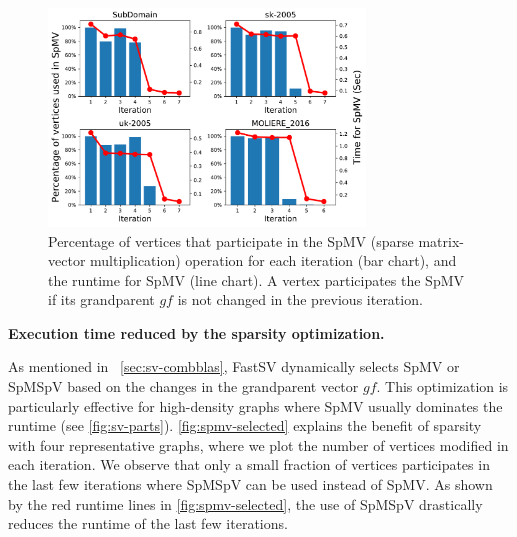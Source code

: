 \documentclass{sokendai_thesis} %
\newcommand{\Name}[0]{FastSV} %
\begin{document}
\begin{figure}[t]
\centering
\includegraphics[width=0.75\textwidth]{figures/spmv-selected.pdf}
\vspace{-5pt}
\caption{Percentage of vertices that participate in the SpMV (sparse matrix-vector multiplication) operation for each iteration (bar chart), and the runtime for SpMV (line chart). A vertex participates the SpMV if its grandparent $\mathit{gf}$ is not changed in the previous iteration.}
\vspace{-10pt}
\label{fig:spmv-selected}
\end{figure}

\textbf{Execution time reduced by the sparsity optimization.}
\label{sec:sparsity}

As mentioned in ~\autoref{sec:sv-combblas}, \Name{} dynamically selects SpMV or SpMSpV based on the changes in the grandparent vector $\mathit{gf}$.
This optimization is particularly effective for high-density graphs where SpMV usually dominates the runtime (see  \autoref{fig:sv-parts}).
\autoref{fig:spmv-selected} explains the benefit of sparsity with four representative graphs, where we plot the number of vertices modified in each iteration.
We observe that only a small fraction of vertices participates in the last few iterations where SpMSpV can be used instead of SpMV.
As shown by the red runtime lines in \autoref{fig:spmv-selected}, the use of SpMSpV drastically reduces the runtime of the last few iterations. 
\end{document}
